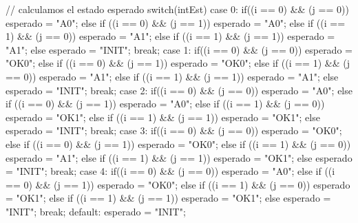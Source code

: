 \begin{mycode}[style=verilogstyle, caption={Banco de pruebas en C++ que se simula con Verilator.}, label=lst:mef-verilator]
{{{    
                // calculamos el estado esperado
                switch(intEst){
                    case 0: if((i == 0) && (j == 0)){
                                    esperado = "A0";
                                 } else if ((i == 0) && (j == 1)){
                                     esperado = "A0";
                                 } else if ((i == 1) && (j == 0)){
                                     esperado = "A1";
                                 } else if ((i == 1) && (j == 1)) {
                                     esperado = "A1";
                                 } else esperado = "INIT";
                                 break;
                    case 1: if((i == 0) && (j == 0)){
                                    esperado = "OK0";
                                 } else if ((i == 0) && (j == 1)){
                                     esperado = "OK0";
                                 } else if ((i == 1) && (j == 0)){
                                     esperado = "A1";
                                 } else if ((i == 1) && (j == 1)) {
                                     esperado = "A1";
                                 } else esperado = "INIT";
                                 break;
                    case 2: if((i == 0) && (j == 0)){
                                    esperado = "A0";
                                 } else if ((i == 0) && (j == 1)){
                                     esperado = "A0";
                                 } else if ((i == 1) && (j == 0)){
                                     esperado = "OK1";
                                 } else if ((i == 1) && (j == 1)) {
                                     esperado = "OK1";
                                 } else esperado = "INIT";
                                 break;
                    case 3: if((i == 0) && (j == 0)){
                                    esperado = "OK0";
                                 } else if ((i == 0) && (j == 1)){
                                     esperado = "OK0";
                                 } else if ((i == 1) && (j == 0)){
                                     esperado = "A1";
                                 } else if ((i == 1) && (j == 1)) {
                                     esperado = "OK1";
                                 } else esperado = "INIT";
                                 break;
                    case 4: if((i == 0) && (j == 0)){
                                    esperado = "A0";
                                 } else if ((i == 0) && (j == 1)){
                                     esperado = "OK0";
                                 } else if ((i == 1) && (j == 0)){
                                     esperado = "OK1";
                                 } else if ((i == 1) && (j == 1)) {
                                     esperado = "OK1";
                                 } else esperado = "INIT";
                                 break;
                    default: esperado = "INIT";
                }
    
}}}
\end{mycode}
